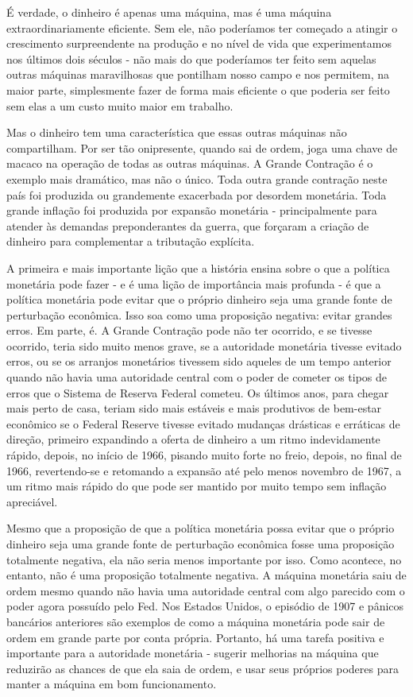 \documentclass[a4paper,12pt]{article}[abntex2]
\begin{document}
É verdade, o dinheiro é apenas uma máquina, mas é uma máquina extraordinariamente eficiente. Sem ele, não poderíamos ter começado a atingir o crescimento surpreendente na produção e no nível de vida que experimentamos nos últimos dois séculos - não mais do que poderíamos ter feito sem aquelas outras máquinas maravilhosas que pontilham nosso campo e nos permitem, na maior parte, simplesmente fazer de forma mais eficiente o que poderia ser feito sem elas a um custo muito maior em trabalho.

Mas o dinheiro tem uma característica que essas outras máquinas não compartilham. Por ser tão onipresente, quando sai de ordem, joga uma chave de macaco na operação de todas as outras máquinas. A Grande Contração é o exemplo mais dramático, mas não o único. Toda outra grande contração neste país foi produzida ou grandemente exacerbada por desordem monetária. Toda grande inflação foi produzida por expansão monetária - principalmente para atender às demandas preponderantes da guerra, que forçaram a criação de dinheiro para complementar a tributação explícita.

A primeira e mais importante lição que a história ensina sobre o que a política monetária pode fazer - e é uma lição de importância mais profunda - é que a política monetária pode evitar que o próprio dinheiro seja uma grande fonte de perturbação econômica. Isso soa como uma proposição negativa: evitar grandes erros. Em parte, é. A Grande Contração pode não ter ocorrido, e se tivesse ocorrido, teria sido muito menos grave, se a autoridade monetária tivesse evitado erros, ou se os arranjos monetários tivessem sido aqueles de um tempo anterior quando não havia uma autoridade central com o poder de cometer os tipos de erros que o Sistema de Reserva Federal cometeu. Os últimos anos, para chegar mais perto de casa, teriam sido mais estáveis e mais produtivos de bem-estar econômico se o Federal Reserve tivesse evitado mudanças drásticas e erráticas de direção, primeiro expandindo a oferta de dinheiro a um ritmo indevidamente rápido, depois, no início de 1966, pisando muito forte no freio, depois, no final de 1966, revertendo-se e retomando a expansão até pelo menos novembro de 1967, a um ritmo mais rápido do que pode ser mantido por muito tempo sem inflação apreciável.

Mesmo que a proposição de que a política monetária possa evitar que o próprio dinheiro seja uma grande fonte de perturbação econômica fosse uma proposição totalmente negativa, ela não seria menos importante por isso. Como acontece, no entanto, não é uma proposição totalmente negativa. A máquina monetária saiu de ordem mesmo quando não havia uma autoridade central com algo parecido com o poder agora possuído pelo Fed. Nos Estados Unidos, o episódio de 1907 e pânicos bancários anteriores são exemplos de como a máquina monetária pode sair de ordem em grande parte por conta própria. Portanto, há uma tarefa positiva e importante para a autoridade monetária - sugerir melhorias na máquina que reduzirão as chances de que ela saia de ordem, e usar seus próprios poderes para manter a máquina em bom funcionamento.
\end{document}
